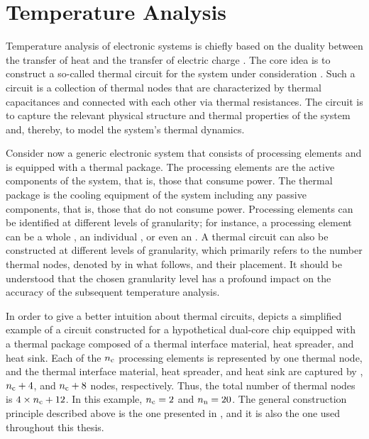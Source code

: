 \section{Temperature Analysis}

Temperature analysis of electronic systems is chiefly based on the duality
between the transfer of heat and the transfer of electric charge
\cite{kreith2000}. The core idea is to construct a so-called thermal 
circuit for the system under consideration \cite{skadron2003}. Such a circuit is
a collection of thermal nodes that are characterized by thermal capacitances and
connected with each other via thermal resistances. The circuit is to capture the
relevant physical structure and thermal properties of the system and, thereby,
to model the system's thermal dynamics.

Consider now a generic electronic system that consists of \nc processing
elements and is equipped with a thermal package. The processing elements are the
active components of the system, that is, those that consume power. The thermal
package is the cooling equipment of the system including any passive components,
that is, those that do not consume power. Processing elements can be identified
at different levels of granularity; for instance, a processing element can be a
whole , an individual , or even an . A thermal 
circuit can also be constructed at different levels of granularity, which
primarily refers to the number thermal nodes, denoted by \nn in what follows,
and their placement. It should be understood that the chosen granularity level
has a profound impact on the accuracy of the subsequent temperature analysis.


In order to give a better intuition about thermal  circuits,
 depicts a simplified example of a circuit constructed for a
hypothetical dual-core chip equipped with a thermal package composed of a
thermal interface material, heat spreader, and heat sink. Each of the ${n_\mathrm{c}}$
processing elements is represented by one thermal node, and the thermal
interface material, heat spreader, and heat sink are captured by \nc, ${n_\mathrm{c}} + 4$,
and ${n_\mathrm{c}} + 8$ nodes, respectively. Thus, the total number of thermal nodes \nn
is $4 \times {n_\mathrm{c}} + 12$. In this example, ${n_\mathrm{c}} = 2$ and ${n_\mathrm{n}} = 20$. The general
construction principle described above is the one presented in
\cite{skadron2003, huang2008}, and it is also the one used throughout this
thesis.

